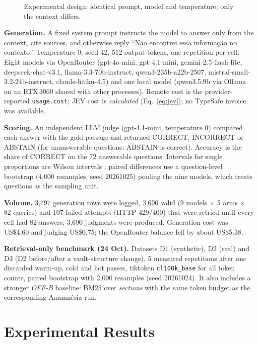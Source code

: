 \documentclass[conference,onecolumn,11pt]{IEEEtran}
\newcommand{\anam}{Anam\-n\'esia}
\begin{document}
\begin{figure}[!htbp]\centering
{}
\caption{Experimental design: identical prompt, model and temperature; only the context differs.}\label{fig:design}
\end{figure}

\textbf{Generation.} A fixed system prompt instructs the model to answer only from the context, cite sources, and otherwise reply ``N\~ao encontrei essa informa\c{c}\~ao no contexto''. Temperature 0, seed 42, 512 output tokens, one repetition per cell. Eight models via OpenRouter \cite{openrouter} (gpt-4o-mini, gpt-4.1-mini, gemini-2.5-flash-lite, deepseek-chat-v3.1, llama-3.3-70b-instruct, qwen3-235b-a22b-2507, mistral-small-3.2-24b-instruct, claude-haiku-4.5) and one local model (qwen3.5:9b via Ollama on an RTX\,3060 shared with other processes). Remote cost is the provider-reported \texttt{usage.cost}; JEV cost is \emph{calculated} (Eq.~\ref{eq:jev}); no TypeSafe invoice was available.

\textbf{Scoring.} An independent LLM judge (gpt-4.1-mini, temperature 0) compared each answer with the gold passage and returned CORRECT, INCORRECT or ABSTAIN (for unanswerable questions: ABSTAIN is correct). Accuracy is the share of CORRECT on the 72 answerable questions. Intervals for single proportions are Wilson intervals \cite{wilson1927}; paired differences use a question-level bootstrap \cite{efron1979bootstrap} (4,000 resamples, seed 20261025) pooling the nine models, which treats questions as the sampling unit.

\textbf{Volume.} 3,797 generation rows were logged, 3,690 valid (9 models $\times$ 5 arms $\times$ 82 queries) and 107 failed attempts (HTTP 429/400) that were retried until every cell had 82 answers; 3,690 judgments were produced. Generation cost was US\$4.60 and judging US\$0.75; the OpenRouter balance fell by about US\$5.38.

\textbf{Retrieval-only benchmark (24 Oct).} Datasets D1 (synthetic), D2 (real) and D3 (D2 before/after a vault-structure change), 5 measured repetitions after one discarded warm-up, cold and hot passes, tiktoken \texttt{cl100k\_base} for all token counts, paired bootstrap with 2,000 resamples (seed 20261024). It also includes a stronger \emph{OFF-B} baseline: BM25 over \emph{sections} with the same token budget as the corresponding \anam{} run.

\FloatBarrier
\section{Experimental Results}\label{sec:results}
\end{document}
